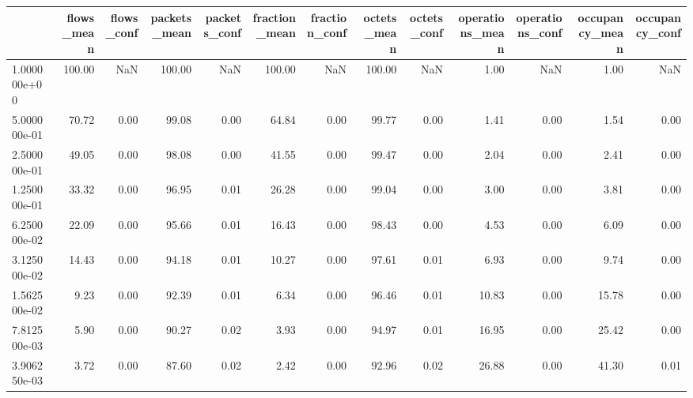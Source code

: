 \begin{tabular}{lrrrrrrrrrrrr}
\toprule
{} &  flows\_mean &  flows\_conf &  packets\_mean &  packets\_conf &  fraction\_mean &  fraction\_conf &  octets\_mean &  octets\_conf &  operations\_mean &  operations\_conf &  occupancy\_mean &  occupancy\_conf \\
\midrule
1.000000e+00 &      100.00 &         NaN &        100.00 &           NaN &         100.00 &            NaN &       100.00 &          NaN &             1.00 &              NaN &            1.00 &             NaN \\
5.000000e-01 &       70.72 &        0.00 &         99.08 &          0.00 &          64.84 &           0.00 &        99.77 &         0.00 &             1.41 &             0.00 &            1.54 &            0.00 \\
2.500000e-01 &       49.05 &        0.00 &         98.08 &          0.00 &          41.55 &           0.00 &        99.47 &         0.00 &             2.04 &             0.00 &            2.41 &            0.00 \\
1.250000e-01 &       33.32 &        0.00 &         96.95 &          0.01 &          26.28 &           0.00 &        99.04 &         0.00 &             3.00 &             0.00 &            3.81 &            0.00 \\
6.250000e-02 &       22.09 &        0.00 &         95.66 &          0.01 &          16.43 &           0.00 &        98.43 &         0.00 &             4.53 &             0.00 &            6.09 &            0.00 \\
3.125000e-02 &       14.43 &        0.00 &         94.18 &          0.01 &          10.27 &           0.00 &        97.61 &         0.01 &             6.93 &             0.00 &            9.74 &            0.00 \\
1.562500e-02 &        9.23 &        0.00 &         92.39 &          0.01 &           6.34 &           0.00 &        96.46 &         0.01 &            10.83 &             0.00 &           15.78 &            0.00 \\
7.812500e-03 &        5.90 &        0.00 &         90.27 &          0.02 &           3.93 &           0.00 &        94.97 &         0.01 &            16.95 &             0.00 &           25.42 &            0.00 \\
3.906250e-03 &        3.72 &        0.00 &         87.60 &          0.02 &           2.42 &           0.00 &        92.96 &         0.02 &            26.88 &             0.00 &           41.30 &            0.01 \\

\end{tabular}
